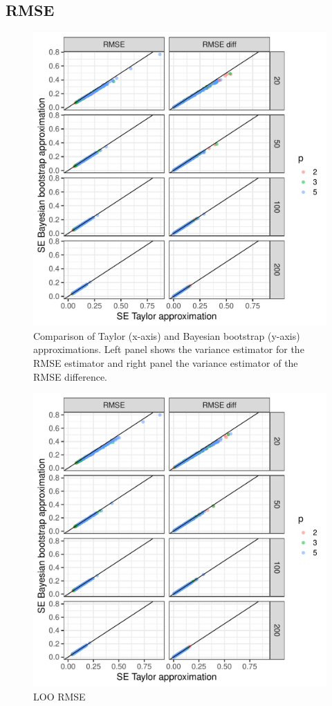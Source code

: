 \documentclass{article}
\begin{document}
\subsection{RMSE}
\begin{figure}[!htb]
    \centering
    \includegraphics[width=\textwidth]{rmse.pdf}
    \caption{Comparison of Taylor (x-axis) and Bayesian bootstrap (y-axis) approximations. Left panel shows the variance estimator for the RMSE estimator and right panel the variance estimator of the RMSE difference.}
    \label{fig:rmse-plot}
\end{figure}

\begin{figure}[!htb]
    \centering
    \includegraphics[width=\textwidth]{loo_rmse.pdf}
    \caption{LOO RMSE}
    \label{fig:loo-rmse-plot}
\end{figure}
\end{document}
